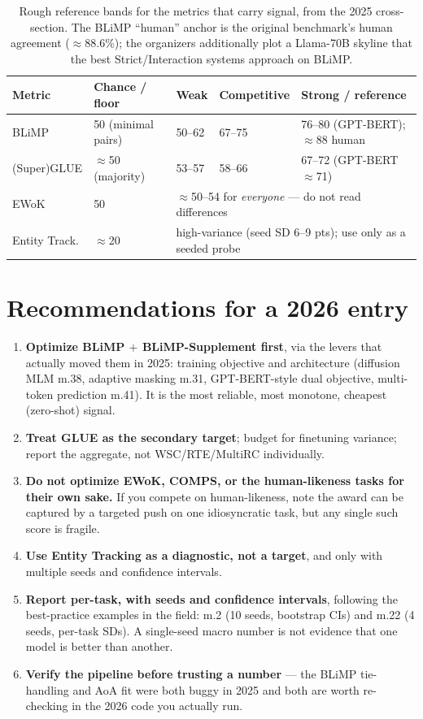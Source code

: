 \documentclass[11pt]{article}
\begin{document}
\begin{table}[h]
\centering\small
\renewcommand{\arraystretch}{1.2}
\begin{tabular}{@{}l l l l l@{}}
\toprule
\textbf{Metric} & \textbf{Chance / floor} & \textbf{Weak} & \textbf{Competitive} & \textbf{Strong / reference}\\
\midrule
BLiMP        & 50 (minimal pairs)   & 50--62 & 67--75 & 76--80 (GPT-BERT); $\approx$88 human\\
(Super)GLUE  & $\approx$50 (majority)& 53--57 & 58--66 & 67--72 (GPT-BERT $\approx$71)\\
EWoK         & 50                   & \multicolumn{3}{l}{$\approx$50--54 for \emph{everyone} --- do not read differences}\\
Entity Track.& $\approx$20          & \multicolumn{3}{l}{high-variance (seed SD 6--9 pts); use only as a seeded probe}\\
\bottomrule
\end{tabular}
\caption{Rough reference bands for the metrics that carry signal, from the 2025 cross-section. The BLiMP
``human'' anchor is the original benchmark's human agreement ($\approx$88.6\%); the organizers additionally
plot a Llama-70B skyline that the best Strict/Interaction systems approach on BLiMP.}
\label{tab:bands}
\end{table}

\section{Recommendations for a 2026 entry}
\label{sec:rec}
\begin{enumerate}\itemsep2pt
\item \textbf{Optimize BLiMP $+$ BLiMP-Supplement first}, via the levers that actually moved them in 2025:
training objective and architecture (diffusion MLM m.38, adaptive masking m.31, GPT-BERT-style dual
objective, multi-token prediction m.41). It is the most reliable, most monotone, cheapest (zero-shot) signal.
\item \textbf{Treat GLUE as the secondary target}; budget for finetuning variance; report the aggregate, not
WSC/RTE/MultiRC individually.
\item \textbf{Do not optimize EWoK, COMPS, or the human-likeness tasks for their own sake.} If you compete on
human-likeness, note the award can be captured by a targeted push on one idiosyncratic task, but any single
such score is fragile.
\item \textbf{Use Entity Tracking as a diagnostic, not a target}, and only with multiple seeds and confidence
intervals.
\item \textbf{Report per-task, with seeds and confidence intervals}, following the best-practice examples in
the field: m.2 (10 seeds, bootstrap CIs) and m.22 (4 seeds, per-task SDs). A single-seed macro number is not
evidence that one model is better than another.
\item \textbf{Verify the pipeline before trusting a number} --- the BLiMP tie-handling and AoA fit were both
buggy in 2025 and both are worth re-checking in the 2026 code you actually run.
\end{enumerate}
\end{document}
